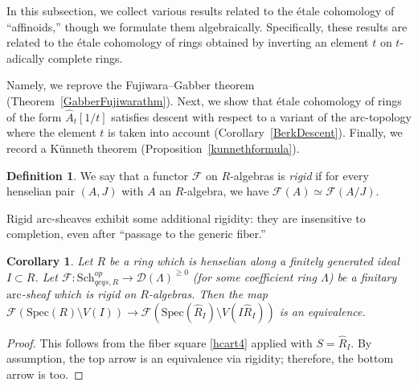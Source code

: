\documentclass[reqno]{amsart}
\newcommand{\sF}{\mathcal{F}}
\newcommand{\spec}{\mathrm{Spec}}
\newcommand{\arc}{\mathrm{arc}}
\newcommand{\D}{\mathcal{D}}
\newtheorem{corollary}[theorem]{Corollary}
\theoremstyle{definition}
\newtheorem{definition}[theorem]{Definition}
\begin{document}
In this subsection, we collect various results related to the \'etale
cohomology of ``affinoids,'' though we formulate them algebraically. 
Specifically, these results are related to the \'etale cohomology of rings
obtained by inverting an element $t$ on $t$-adically complete rings. 

Namely, we
reprove the Fujiwara--Gabber theorem (Theorem~\ref{GabberFujiwarathm}). 
Next, we show that \'etale cohomology of rings of the form $\hat{A}_t[1/t]$
satisfies descent with respect to a variant of the $\arc$-topology where the
element $t$ is
taken into account (Corollary~\ref{BerkDescent}). Finally, we record a
K\"unneth theorem (Proposition~\ref{kunnethformula}). 


\begin{definition} 
We say that a functor $\sF$ on $R$-algebras is \emph{rigid} if 
for every henselian pair $(A, J)$ with $A$ an $R$-algebra, we have $\sF(A) \simeq
\sF(A/J)$. 
\end{definition} 



Rigid $\arc$-sheaves exhibit some additional rigidity: they are insensitive to
completion, even after ``passage to the generic fiber.''

\begin{corollary}
\label{GabberFujiwara}
Let $R$ be a ring which is henselian along a finitely generated ideal $I \subset R$. 
Let $\sF\colon  \mathrm{Sch}_{qcqs,R}^{op} \to \D( \Lambda)^{\geq 0}$ (for some coefficient
ring $\Lambda$) be a finitary
$\arc$-sheaf which is  rigid on $R$-algebras. 
Then the map 
$\sF( \spec(R) \setminus V(I)) \to \sF( \spec( \hat{R}_I) \setminus V(I
\hat{R}_I))$ is an
equivalence. 
\label{critequiv}
\end{corollary} 
\begin{proof} 
This follows from the fiber square
\eqref{hcart4} applied with $S = \hat{R}_I$. By assumption, the top arrow is an
equivalence via rigidity; therefore, the bottom arrow is too. 
\end{proof} 
\end{document}
